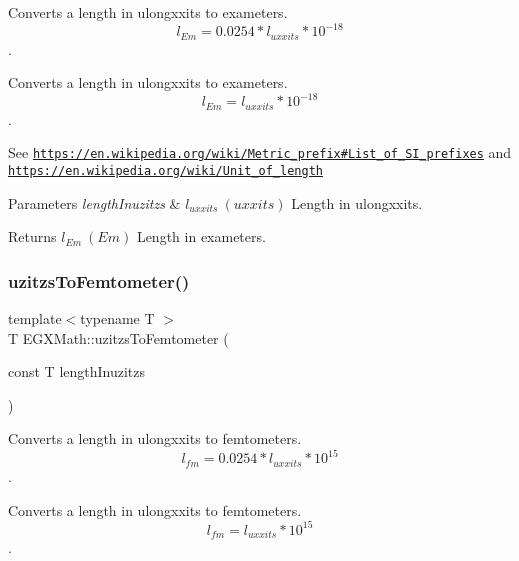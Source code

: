 Converts a length in ulongxxits to exameters. \[ l_{Em}=0.0254 * l_{uxxits} * 10^{-18} \]. 

Converts a length in ulongxxits to exameters. \[ l_{Em}=l_{uxxits} * 10^{-18} \].

See \href{https://en.wikipedia.org/wiki/Metric_prefix#List_of_SI_prefixes}{\tt https\+://en.\+wikipedia.\+org/wiki/\+Metric\+\_\+prefix\#\+List\+\_\+of\+\_\+\+S\+I\+\_\+prefixes} and \href{https://en.wikipedia.org/wiki/Unit_of_length}{\tt https\+://en.\+wikipedia.\+org/wiki/\+Unit\+\_\+of\+\_\+length} 
\begin{DoxyParams}{Parameters}
{\em length\+Inuzitzs} & $ l_{uxxits}\ (uxxits)$ Length in ulongxxits. \\
\hline
\end{DoxyParams}
\begin{DoxyReturn}{Returns}
$ l_{Em}\ (Em)$ Length in exameters. 
\end{DoxyReturn}
\mbox{\label{group___e_g_x_math-_conversions-_length_conversions-_imperial-uzitzs-_s_i_ga55b363df9781c5d92c86bcef272dfc7f}} 
\subsubsection{\texorpdfstring{uzitzs\+To\+Femtometer()}{uzitzsToFemtometer()}}
{\footnotesize\ttfamily template$<$typename T $>$ \\
T E\+G\+X\+Math\+::uzitzs\+To\+Femtometer (\begin{DoxyParamCaption}\item[{const T}]{length\+Inuzitzs }\end{DoxyParamCaption})}



Converts a length in ulongxxits to femtometers. \[ l_{fm}=0.0254 * l_{uxxits} * 10^{15} \]. 

Converts a length in ulongxxits to femtometers. \[ l_{fm}=l_{uxxits} * 10^{15} \].

